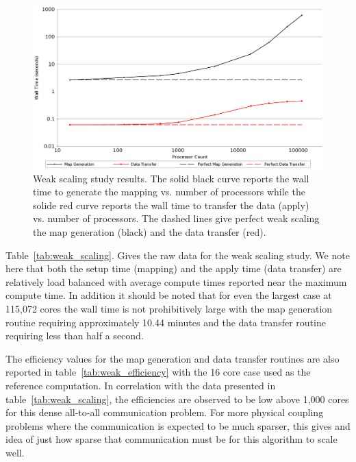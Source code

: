 \documentclass{mc2013}
\begin{document}
\begin{figure}[ht!]
  \centering
  \includegraphics[width=5.5in]{WeakScaling.png}
  \caption{Weak scaling study results. The solid black curve reports
    the wall time to generate the mapping vs. number of processors
    while the solide red curve reports the wall time to transfer the
    data (apply) vs. number of processors. The dashed lines give
    perfect weak scaling the map generation (black) and the data
    transfer (red).}
  \label{fig:weak_scaling}
\end{figure}

Table~\ref{tab:weak_scaling}. Gives the raw data for the weak scaling
study. We note here that both the setup time (mapping) and the apply
time (data transfer) are relatively load balanced with average compute
times reported near the maximum compute time. In addition it should be
noted that for even the largest case at 115,072 cores the wall time is
not prohibitively large with the map generation routine requiring
approximately 10.44 minutes and the data transfer routine requiring
less than half a second.

The efficiency values for the map generation and data transfer
routines are also reported in table~\ref{tab:weak_efficiency} with the
16 core case used as the reference computation. In correlation with
the data presented in table~\ref{tab:weak_scaling}, the efficiencies
are observed to be low above 1,000 cores for this dense all-to-all
communication problem. For more physical coupling problems where the
communication is expected to be much sparser, this gives and idea of
just how sparse that communication must be for this algorithm to scale
well.
\end{document}
